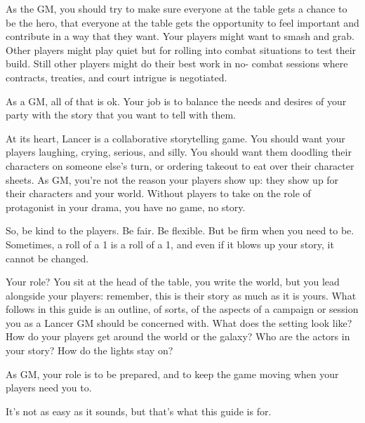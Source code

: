 As the GM, you should try to make sure everyone at the table gets a chance to be the hero,
that everyone at the table gets the opportunity to feel important and contribute in a way that they
want. Your players might want to smash and grab. Other players might play quiet but for rolling
into combat situations to test their build. Still other players might do their best work in no-
combat sessions where contracts, treaties, and court intrigue is negotiated.


As a GM, all of that is ok. Your job is to balance the needs and desires of your party with the
story that you want to tell with them.


At its heart, Lancer is a collaborative storytelling game. You should want your players
laughing, crying, serious, and silly. You should want them doodling their characters on someone
else’s turn, or ordering takeout to eat over their character sheets. As GM, you’re not the reason
your players show up: they show up for their characters and your world. Without players to take
on the role of protagonist in your drama, you have no game, no story.


So, be kind to the players. Be fair. Be flexible. But be firm when you need to be. Sometimes, a
roll of a 1 is a roll of a 1, and even if it blows up your story, it cannot be changed.





Your role? You sit at the head of the table, you write the world, but you lead alongside your
players: remember, this is their story as much as it is yours. What follows in this guide is an
outline, of sorts, of the aspects of a campaign or session you as a Lancer GM should be
concerned with. What does the setting look like? How do your players get around the world or
the galaxy? Who are the actors in your story? How do the lights stay on?


As GM, your role is to be prepared, and to keep the game moving when your players need you
to.


It’s not as easy as it sounds, but that’s what this guide is for.


